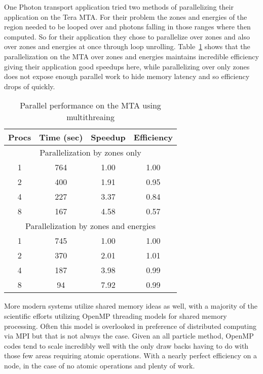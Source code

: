 %
One Photon transport application tried two methods of parallelizing their application on the Tera MTA. 
%
For their problem the zones and energies of the region needed to be looped over and photons falling in those ranges where then computed.
%
So for their application they chose to parallelize over zones and also over zones and energies at once through loop unrolling.
%
Table~\ref{tab:MTAPerf} shows that the parallelization on the MTA over zones and energies maintains incredible efficiency giving their application good speedups here, while parallelizing over only zones does not expose enough parallel work to hide memory latency and so efficiency drops of quickly.
%
\begin{table}
\caption {Parallel performance on the MTA using multithreaing} \label{tab:MTAPerf} 
\begin{center}
\begin{tabular}{|c|c|c|c|}
\hline
Procs & Time (sec) & Speedup & Efficiency \\
\hline
\multicolumn{4}{|c|}{Parallelization by zones only} \\
\hline
1 & 764 & 1.00 & 1.00 \\
\hline
2 & 400 & 1.91 & 0.95 \\
\hline
4 & 227 & 3.37 & 0.84 \\
\hline
8 & 167 & 4.58 & 0.57 \\
\hline
\multicolumn{4}{|c|}{Parallelization by zones and energies} \\
\hline
1 & 745 & 1.00 & 1.00 \\
\hline
2 & 370 & 2.01 & 1.01 \\
\hline
4 & 187 & 3.98 & 0.99 \\
\hline
8 & 94 & 7.92 & 0.99 \\
\hline
\end{tabular}
\end{center}
\end{table}

More modern systems utilize shared memory ideas as well, with a majority of the scientific efforts utilizing OpenMP threading models for shared memory processing.
%
Often this model is overlooked in preference of distributed computing via MPI but that is not always the case.
%
Given an all particle method, OpenMP codes tend to scale incredibly well with the only draw backs having to do with those few areas requiring atomic operations.
%
With a nearly perfect efficiency on a node, in the case of no atomic operations and plenty of work.

